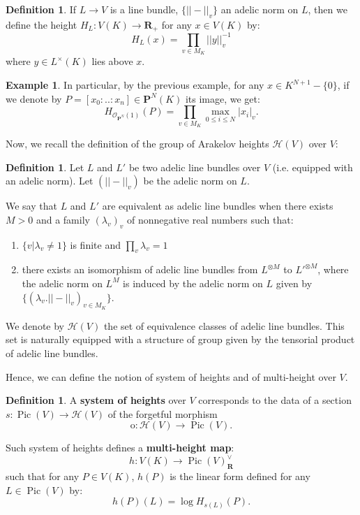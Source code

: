 \documentclass{proc-l}
\newcommand{\R}{\mathbf{R}}
\newcommand{\Proj}{\mathbf{P}}
\DeclareMathOperator{\Pic}{Pic}
\newcommand{\sheafO}{\mathcal{O}}
\theoremstyle{definition}
\newtheorem{definition}[theorem]{Definition}
\newtheorem{example}[theorem]{Example}
\theoremstyle{remark}
\numberwithin{equation}{section}
\begin{document}
\begin{definition}
    If $L \rightarrow V$ is a line bundle, $\{ ||-||_v \}$ an adelic norm on $L$, then we define the height $H_L : V(K) \rightarrow \R_+$ for any $x \in V(K)$ by:
    $$H_L(x) = \prod\limits_{v \in M_K} ||y||_v^{-1}$$where $y \in L^{\times}(K)$ lies above $x$.
\end{definition}

\begin{example}\label{norme_adelique_fubini}
    In particular, by the previous example, for any $x \in K^{N+1}-\{0\}$, if we denote by $P = [x_0:..:x_n] \in \Proj^N(K)$ its image, we get: 
    $$ H_{\sheafO_{\Proj^N}(1)}(P) =  \prod\limits_{v \in M_K}  \max\limits_{0 \leq i \leq N} |x_i|_v . $$
\end{example}

Now, we recall the definition of the group of Arakelov heights $\mathcal{H}(V)$ over $V$:

\begin{definition}
    Let $L$ and $L'$ be two adelic line bundles over $V$ (i.e. equipped with an adelic norm). Let $(||-||_v)$ be the adelic norm on $L$.

    We say that $L$ and $L'$ are equivalent as adelic line bundles when there exists $M > 0$ and a family $(\lambda_v)_v$ of nonnegative real numbers such that:
    \vspace{0,1 cm}
    \begin{enumerate}
        \item $\{v | \lambda_v \neq 1\}$ is finite and $\prod\limits_v \lambda_v = 1$
        \item there exists an isomorphism of adelic line bundles from $L^{\otimes M}$ to $L'^{\otimes M} $, where the adelic norm on $L^M$ is induced by the adelic norm on $L$ given by $\{ (\lambda_v . ||-||_v)_{v \in M_K} \} $.
    \end{enumerate}
    We denote by $\mathcal{H}(V)$ the set of equivalence classes of adelic line bundles. This set is naturally equipped with a structure of group given by the tensorial product of adelic line bundles.
\end{definition}

Hence, we can define the notion of system of heights and of multi-height over \nolinebreak $V$.


\begin{definition}
    A \textbf{system of heights} over $V$ corresponds to the data of a section $s : \Pic(V) \rightarrow \mathcal{H}(V)$ of the forgetful morphism $$ \mathrm{o} : \mathcal{H}(V) \rightarrow \Pic(V) .$$

    Such system of heights defines a \textbf{multi-height map}:
    $$ h : V(K) \rightarrow \Pic(V)^{\vee}_{\R}$$
    such that for any $P \in V(K)$, $h(P)$ is the linear form defined for any $L \in \Pic(V)$ by:
    $$ h(P)(L) = \log H_{s(L)}(P) .$$
\end{definition}
\end{document}
